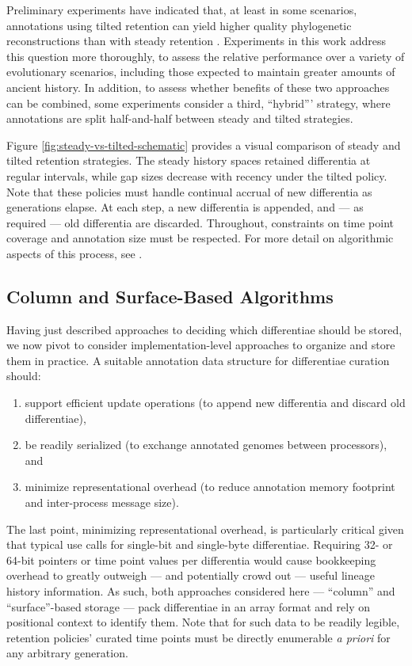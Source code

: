 Preliminary experiments have indicated that, at least in some scenarios, annotations using tilted retention can yield higher quality phylogenetic reconstructions than with steady retention \citep{moreno2022hereditary}.
Experiments in this work address this question more thoroughly, to assess the relative performance over a variety of evolutionary scenarios, including those expected to maintain greater amounts of ancient history.
In addition, to assess whether benefits of these two approaches can be combined, some experiments consider a third, ``hybrid''' strategy, where annotations are split half-and-half between steady and tilted strategies.

Figure \ref{fig:steady-vs-tilted-schematic} provides a visual comparison of steady and tilted retention strategies.
The steady history spaces retained differentia at regular intervals, while gap sizes decrease with recency under the tilted policy.
Note that these policies must handle continual accrual of new differentia as generations elapse.
At each step, a new differentia is appended, and --- as required --- old differentia are discarded.
Throughout, constraints on time point coverage and annotation size must be respected.
For more detail on algorithmic aspects of this process, see \citet{moreno2024algorithms,moreno2024structured}.

\subsection{Column and Surface-Based Algorithms}
\label{sec:methods-column-vs-surface-algorithms}

Having just described approaches to deciding which differentiae should be stored, we now pivot to consider implementation-level approaches to organize and store them in practice.
A suitable annotation data structure for differentiae curation should:
\begin{enumerate}
\item support efficient update operations (to append new differentia and discard old differentiae),
\item be readily serialized (to exchange annotated genomes between processors), and
\item minimize representational overhead (to reduce annotation memory footprint and inter-process message size).
\end{enumerate}

The last point, minimizing representational overhead, is particularly critical given that typical use calls for single-bit and single-byte differentiae.
Requiring 32- or 64-bit pointers or time point values per differentia would cause bookkeeping overhead to greatly outweigh --- and potentially crowd out --- useful lineage history information.
As such, both approaches considered here --- ``column'' and ``surface''-based storage --- pack differentiae in an array format and rely on positional context to identify them.
Note that for such data to be readily legible, retention policies' curated time points must be directly enumerable \textit{a priori} for any arbitrary generation.

